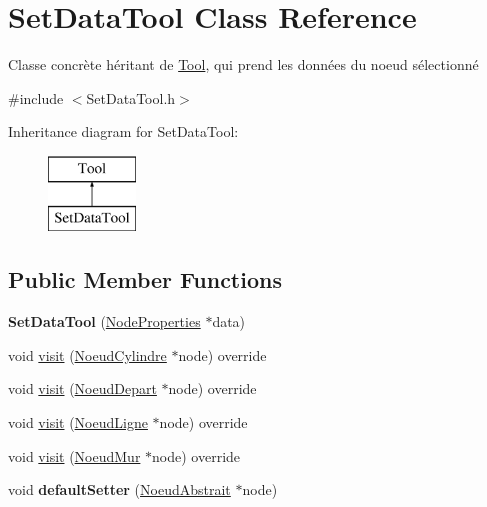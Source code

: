 \hypertarget{class_set_data_tool}{}\section{Set\+Data\+Tool Class Reference}
\label{class_set_data_tool}


Classe concrète héritant de \hyperlink{class_tool}{Tool}, qui prend les données du noeud sélectionné  




{\ttfamily \#include $<$Set\+Data\+Tool.\+h$>$}

Inheritance diagram for Set\+Data\+Tool\+:\begin{figure}[H]
\begin{center}
\leavevmode
\includegraphics[height=2.000000cm]{class_set_data_tool}
\end{center}
\end{figure}
\subsection*{Public Member Functions}
\begin{DoxyCompactItemize}
\item 
\hypertarget{class_set_data_tool_af24195c8ec7c85e37f59f2bedd4c7431}{}{\bfseries Set\+Data\+Tool} (\hyperlink{struct_node_properties}{Node\+Properties} $\ast$data)\label{class_set_data_tool_af24195c8ec7c85e37f59f2bedd4c7431}

\item 
void \hyperlink{group__inf2990_gaab929a1ed9e3f6a2e80a15aef5de8f71}{visit} (\hyperlink{class_noeud_cylindre}{Noeud\+Cylindre} $\ast$node) override
\item 
void \hyperlink{group__inf2990_gabe996cec1a80bdb4a10383bf4716532d}{visit} (\hyperlink{class_noeud_depart}{Noeud\+Depart} $\ast$node) override
\item 
void \hyperlink{group__inf2990_ga1c46b84b64c6ff0ca516e5419a33911c}{visit} (\hyperlink{class_noeud_ligne}{Noeud\+Ligne} $\ast$node) override
\item 
void \hyperlink{group__inf2990_ga5833b6797fd9a603bedd502431fc76cc}{visit} (\hyperlink{class_noeud_mur}{Noeud\+Mur} $\ast$node) override
\item 
\hypertarget{group__inf2990_ga410f169c9f53a3a018bce606e0ba9f23}{}void {\bfseries default\+Setter} (\hyperlink{class_noeud_abstrait}{Noeud\+Abstrait} $\ast$node)\label{group__inf2990_ga410f169c9f53a3a018bce606e0ba9f23}

\end{DoxyCompactItemize}


